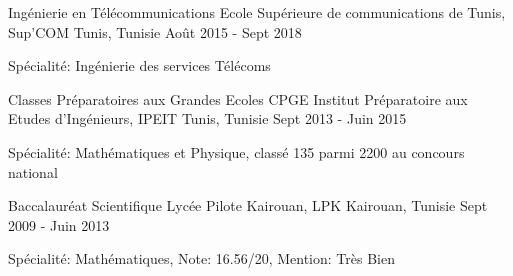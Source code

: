 

\begin{cventries}

  \cventry
    {Ingénierie en Télécommunications} %
    {Ecole Supérieure de communications de Tunis, Sup'COM} %
    {Tunis, Tunisie} %
    {Août 2015 - Sept 2018} %
    {
      \begin{cvitems} %
        \item { Spécialité: Ingénierie des services Télécoms}
      \end{cvitems}
    }
    
    \cventry
    {Classes Préparatoires aux Grandes Ecoles CPGE } %
    {Institut Préparatoire aux Etudes d'Ingénieurs, IPEIT} %
    {Tunis, Tunisie} %
    {Sept 2013 - Juin 2015} %
    {
      \begin{cvitems} %
        \item { Spécialité: Mathématiques et Physique, classé 135 parmi 2200 au concours national}
      \end{cvitems}
    }
    
     \cventry
    {Baccalauréat Scientifique} %
    {Lycée Pilote Kairouan, LPK} %
    {Kairouan, Tunisie} %
    {Sept 2009 - Juin 2013} %
    {
      \begin{cvitems} %
        \item { Spécialité: Mathématiques, Note: 16.56/20, Mention: Très Bien }
      \end{cvitems}
    }

\end{cventries}
